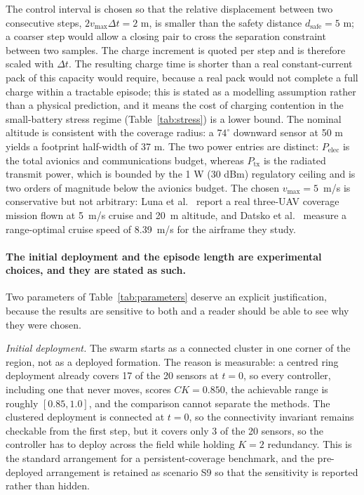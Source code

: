 \documentclass[conference]{IEEEtran}
\begin{document}
The control interval is chosen so that the relative displacement between two consecutive steps, $2 v_{\max}\Delta t = 2$ m, is smaller than the safety distance $d_{\mathrm{safe}} = 5$ m; a coarser step would allow a closing pair to cross the separation constraint between two samples. The charge increment is quoted per step and is therefore scaled with $\Delta t$. The resulting charge time is shorter than a real constant-current pack of this capacity would require, because a real pack would not complete a full charge within a tractable episode; this is stated as a modelling assumption rather than a physical prediction, and it means the cost of charging contention in the small-battery stress regime (Table~\ref{tab:stress}) is a lower bound. The nominal altitude is consistent with the coverage radius: a $74^\circ$ downward sensor at 50 m yields a footprint half-width of 37 m. The two power entries are distinct: $P_{\mathrm{elec}}$ is the total avionics and communications budget, whereas $P_{\mathrm{tx}}$ is the radiated transmit power, which is bounded by the 1 W (30 dBm) regulatory ceiling and is two orders of magnitude below the avionics budget. The chosen $v_{\max}=5$~m/s is conservative but not arbitrary: Luna et al.~\cite{luna2022} report a real three-UAV coverage mission flown at 5~m/s cruise and 20~m altitude, and Datsko et al.~\cite{datsko2024} measure a range-optimal cruise speed of 8.39~m/s for the airframe they study.

\paragraph{The initial deployment and the episode length are experimental choices,
and they are stated as such.}
Two parameters of Table~\ref{tab:parameters} deserve an explicit justification, because the results are sensitive to both and a reader should be able to see why they were chosen.

\emph{Initial deployment.} The swarm starts as a connected cluster in one corner of the region, not as a deployed formation. The reason is measurable: a centred ring deployment already covers 17 of the 20 sensors at $t=0$, so every controller, including one that never moves, scores $CK=0.850$, the achievable range is roughly $[0.85,1.0]$, and the comparison cannot separate the methods. The clustered deployment is connected at $t=0$, so the connectivity invariant remains checkable from the first step, but it covers only 3 of the 20 sensors, so the controller has to deploy across the field while holding $K=2$ redundancy. This is the standard arrangement for a persistent-coverage benchmark, and the pre-deployed arrangement is retained as scenario S9 so that the sensitivity is reported rather than hidden.
\end{document}
